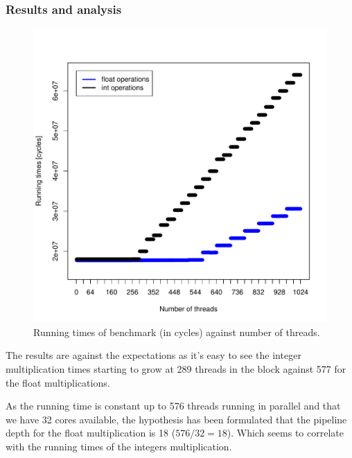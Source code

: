 \documentclass{report}
\def \scalingfactor{.8}
\begin{document}
	\subsubsection{Results and analysis}
    \begin{figure}[H]
    	\centering
		\vspace{-20pt}
	    \includegraphics[width=\scalingfactor\linewidth]{"graphics/float_vs_int_running_times"}
		\vspace{-15pt}
		\captionsetup{justification=centering}
        \caption{Running times of benchmark (in cycles) against number of threads.}
    \end{figure}
	
    The results are against the expectations as it's easy to see the integer
    multiplication times starting to grow at 289 threads in the block against
    577 for the float multiplications.
    
    As the running time is constant up to 576 threads running in parallel and that we have 32 cores
    available, the hypothesis has been formulated that the pipeline depth for the float multiplication is 18 ($576/32 = 18$). Which seems to correlate with the running
    times of the integers multiplication. 
    
\end{document}
